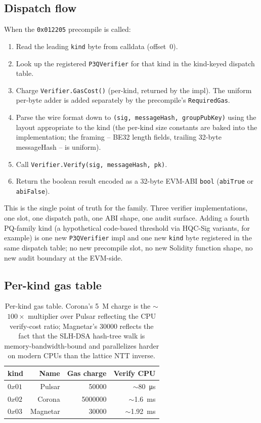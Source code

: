 \subsection{Dispatch flow}

When the \texttt{0x012205} precompile is called:

\begin{enumerate}[leftmargin=2em,nosep]
\item Read the leading \texttt{kind} byte from calldata
  (offset~0).
\item Look up the registered \texttt{P3QVerifier} for that kind
  in the kind-keyed dispatch table.
\item Charge \texttt{Verifier.GasCost()} (per-kind, returned by
  the impl). The uniform per-byte adder is added separately by
  the precompile's \texttt{RequiredGas}.
\item Parse the wire format down to
  \texttt{(sig, messageHash, groupPubKey)} using the layout
  appropriate to the kind (the per-kind size constants are
  baked into the implementation; the framing -- BE32 length
  fields, trailing 32-byte messageHash -- is uniform).
\item Call \texttt{Verifier.Verify(sig, messageHash, pk)}.
\item Return the boolean result encoded as a 32-byte EVM-ABI
  \texttt{bool} (\texttt{abiTrue} or \texttt{abiFalse}).
\end{enumerate}

This is the single point of truth for the family. Three verifier
implementations, one slot, one dispatch path, one ABI shape, one
audit surface. Adding a fourth PQ-family kind (a hypothetical
code-based threshold via HQC-Sig variants, for example) is one
new \texttt{P3QVerifier} impl and one new \texttt{kind} byte
registered in the same dispatch table; no new precompile slot,
no new Solidity function shape, no new audit boundary at the
EVM-side.

\subsection{Per-kind gas table}

\begin{table}[h]
\centering
\small
\begin{tabular}{@{}lrrr@{}}
\toprule
\textbf{kind} & \textbf{Name} & \textbf{Gas charge} & \textbf{Verify CPU} \\
\midrule
$0x01$ & Pulsar   & \SI{50000}{}    & $\sim$\SI{80}{\micro\second} \\
$0x02$ & Corona   & \SI{5000000}{}  & $\sim$\SI{1.6}{\milli\second} \\
$0x03$ & Magnetar & \SI{30000}{}    & $\sim$\SI{1.92}{\milli\second} \\
\bottomrule
\end{tabular}
\caption{Per-kind gas table. Corona's \SI{5}{M} charge is the
$\sim$$100\times$ multiplier over Pulsar reflecting the CPU
verify-cost ratio; Magnetar's \SI{30000}{} reflects the fact
that the SLH-DSA hash-tree walk is memory-bandwidth-bound and
parallelizes harder on modern CPUs than the lattice NTT
inverse.}
\label{tab:gas-per-kind}
\end{table}

